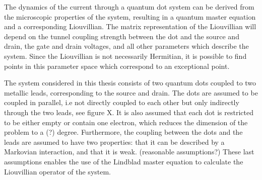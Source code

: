 \documentclass[../main.tex]{subfiles}
\begin{document}
The dynamics of the current through a quantum dot system can be derived from the microscopic properties of the system, resulting in a quantum master equation and a corresponding Liouvillian. The matrix representation of the Liouvillian will depend on the tunnel coupling strength between the dot and the source and drain, the gate and drain voltages, and all other parameters which describe the system. Since the Liouvillian is not necessarily Hermitian, it is possible to find points in this parameter space which correspond to an exceptional point.

The system considered in this thesis consists of two quantum dots coupled to two metallic leads, corresponding to the source and drain. The dots are assumed to be coupled in parallel, i.e not directly coupled to each other but only indirectly through the two leads, see figure X. It is also assumed that each dot is restricted to be either empty or contain one electron, which reduces the dimension of the problem to a (?) degree. Furthermore, the coupling between the dots and the leads are assumed to have two properties: that it can be described by a Markovian interaction, and that it is weak. (reasonable assumptions?) These last assumptions enables the use of the Lindblad master equation to calculate the Liouvillian operator of the system.
\end{document}
